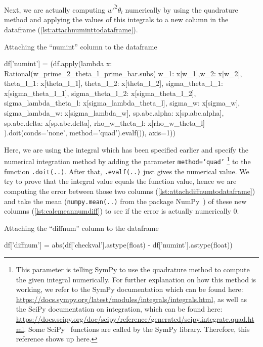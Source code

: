 Next, we are actually computing $\overline{w'^2\theta_l}$ numerically by using the quadrature method
and applying the values of this integrals
to a new column in the dataframe (\cref{lst:attachnuminttodataframe}).
\begin{listing}[!ht]
    \caption{Attaching the \enquote{numint} column to the dataframe}
    \label{lst:attachnuminttodataframe}
    \begin{pythoncode}
        df['numint'] = (df.apply(lambda x: Rational(w_prime_2_theta_l_prime_bar.subs({
            w_1: x[w_1],w_2: x[w_2], theta_l_1: x[theta_l_1], theta_l_2: x[theta_l_2],
            sigma_theta_l_1: x[sigma_theta_l_1], sigma_theta_l_2: x[sigma_theta_l_2],
            sigma_lambda_theta_l: x[sigma_lambda_theta_l], sigma_w: x[sigma_w],
            sigma_lambda_w: x[sigma_lambda_w], sp.abc.alpha: x[sp.abc.alpha],
            sp.abc.delta: x[sp.abc.delta], rho_w_theta_l: x[rho_w_theta_l]
        }).doit(conds='none', method='quad').evalf()), axis=1))
    \end{pythoncode}
\end{listing}
Here, we are using the integral which has been specified earlier
and specify the numerical integration method by adding the parameter \texttt{method='quad'}
\footnote{
    This parameter is telling SymPy to use the quadrature method to compute the given integral numerically.
    For further explanation on how this method is working,
    we refer to the SymPy documentation which can be found here:
    \url{https://docs.sympy.org/latest/modules/integrals/integrals.html},
    as well as the SciPy documentation on integration, which can be found here:
    \url{https://docs.scipy.org/doc/scipy/reference/generated/scipy.integrate.quad.html}.
    Some SciPy~\cite{2020SciPy-NMeth} functions are called by the SymPy library.
    Therefore, this reference shows up here.
}
to the function \texttt{.doit(..)}.
After that, \texttt{.evalf(..)} just gives the numerical value.
We try to prove that the integral value equals the function value,
hence we are computing the error between those two columns (\cref{lst:attachdiffnumtodataframe})
and take the mean (\texttt{numpy.mean(..)} from the package NumPy~\autocite{harris2020array})
of these new columns (\cref{lst:calcmeannumdiff}) to see if the error is actually numerically 0.
\begin{listing}[!ht]
    \caption{Attaching the \enquote{diffnum} column to the dataframe}
    \label{lst:attachdiffnumtodataframe}
    \begin{pythoncode}
        df['diffnum'] = abs(df['checkval'].astype(float) - df['numint'].astype(float))
    \end{pythoncode}
\end{listing}
